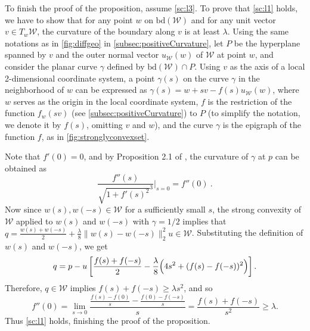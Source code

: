 \documentclass[english]{article}
\newcommand{\cW}{\mathcal{W}}
\newcommand{\bd}{\mathrm{bd}}
\newcommand{\ra}{\rightarrow}
\newenvironment{proofof}[1]{\par\noindent{\bf Proof of #1\ }}{\hfill\BlackBox\\[2mm]}
\begin{document}
\begin{proofof}{\cref{prop:strongconvex}}
To finish the proof of the proposition, assume \eqref{sc:l3}. To prove that \eqref{sc:l1} holds, we have to show that for any point $w$ on $\bd(\cW)$ and for any unit vector $v \in T_w\cW$, the curvature of the boundary along $v$ is at least $\lambda$.
Using the same notations as in \cref{fig:diffgeo} in \cref{subsec:positiveCurvature}, 
let $P$ be the hyperplane spanned by $v$ and the outer normal vector $u_{\cW}(w)$ of $\cW$ at point $w$, and consider the planar curve $\gamma$ defined by $\bd(\cW) \cap P$.
Using $v$ as the axis of a local 2-dimensional coordinate system, a point $\gamma(s)$ on the curve $\gamma$ in the neighborhood of $w$ can be expressed as $\gamma(s) = w + sv - f(s)u_{\cW}(w)$, where $w$ serves as the origin in the local coordinate system, $f$ is the restriction of the function $f_w(sv)$ (see \cref{subsec:positiveCurvature}) to $P$ (to simplify the notation, we denote it by $f(s)$, omitting $v$ and $w$), and the curve $\gamma$ is the epigraph of the function $f$, as in \cref{fig:stronglyconvexset}.

Note that $f'(0)=0$, and by Proposition 2.1 of \citet{pressley2010elementary}, the curvature of $\gamma$ at $p$ can be obtained as 
\[
\frac{f''(s)}{\sqrt{1+f'(s)^2}^3}\Bigg\vert_{s=0} = f''(0)~.
\]
Now since $w(s),w(-s) \in \cW$ for a sufficiently small $s$, the strong convexity of $\cW$ applied to $w(s)$ and $w(-s)$ with $\gamma=1/2$
implies that $q=\frac{w(s)+w(-s)}{2}+\frac{\lambda}{8} \|w(s)-w(-s)\|_2^2 u \in \cW$. Substituting the definition of $w(s)$ and $w(-s)$, we get
\[
q=p - u \left[\frac{f(s)+f(-s)}{2} - \frac{\lambda}{8} \Bigl(4s^2 + (f(s)-f(-s))^2\Bigr)\right].
\]
Therefore, $q \in \cW$ implies
$f(s)+f(-s) \ge \lambda s^2$, and so
\[
	f''(0) = \lim_{s \ra 0} \frac{\frac{f(s) - f(0)}{s} - \frac{f(0) - f(-s)}{s}}{s} = \frac{f(s)+ f(-s)}{s^2} \ge \lambda.
\]
Thus \eqref{sc:l1} holds, finishing the proof of the proposition. 
\end{proofof}
\end{document}
